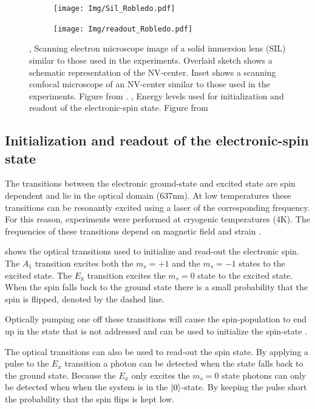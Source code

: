 \begin{figure}[htbp]
    \centering
    \begin{subfigure}[t]{0.49\textwidth}\centering
        \caption{}
        \label{fig:Sil_Robledo}
        \texttt{[image: Img/Sil\_Robledo.pdf]}
    \end{subfigure}
    \begin{subfigure}[t]{0.49\textwidth}\centering
       \caption{}
       \label{fig:readoutRobledo}
       \texttt{[image: Img/readout\_Robledo.pdf]}
   \end{subfigure}
   \caption{, Scanning electron microscope image of  a solid immersion lens (SIL) similar to those used in the experiments. Overlaid sketch shows a schematic representation of the NV-center. Inset shows a scanning confocal microscope of an NV-center similar to those used in the experiments. Figure from \citep{Robledo2011HighFidelity}.  , Energy levels used for initialization and readout of the electronic-spin state. Figure from \citep{Robledo2011HighFidelity}}
\end{figure}

\subsection{Initialization and readout of the electronic-spin state}
The transitions between the electronic ground-state and excited state are spin dependent and lie in the optical domain (637nm).
At low temperatures these transitions can be resonantly excited using a laser of the corresponding frequency.
For this reason, experiments were performed at cryogenic temperatures (4K).
The frequencies of these transitions depend on magnetic field and strain \citep{Hensen2011MeasurementBased}.

 shows the optical transitions used to initialize and read-out the electronic spin.
The $A_1$ transition excites both the $m_s =+1$ and the $m_s=-1$ states to the excited state.
The $E_\mathrm{x}$ transition excites the $m_s = 0$ state to the excited state.
When the spin falls back to the ground state there is a small probability that the spin is flipped, denoted by the dashed line.

Optically pumping one off these transitions will cause the spin-population to end up in the state that is not addressed and can be used to initialize the spin-state \citep{Robledo2011HighFidelity}.

The optical transitions can also be used to read-out the spin state.
By applying a pulse to the $E_x$ transition a photon can be detected when the state falls back to the ground state.
Because the $E_x$ only excites the $m_s=0$ state photons can only be detected when when the system is in the ${\left\vert{0}\right\rangle}$-state.
By keeping the pulse short the probability that the spin flips is kept low.

